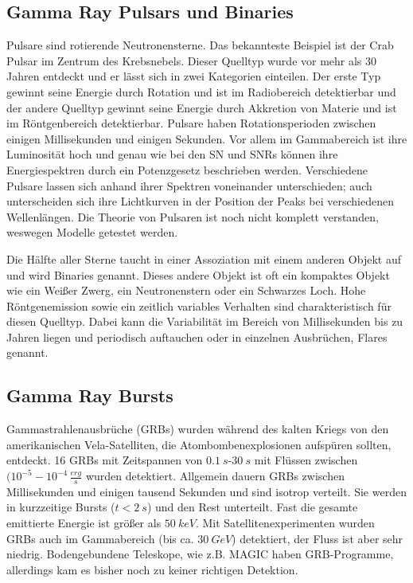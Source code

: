 \subsection{Gamma Ray Pulsars und Binaries}
Pulsare sind rotierende Neutronensterne. 
Das bekannteste Beispiel ist der Crab Pulsar im Zentrum des Krebsnebels.
Dieser Quelltyp wurde vor mehr als 30 Jahren entdeckt und er lässt sich in zwei Kategorien einteilen.
Der erste Typ gewinnt seine Energie durch Rotation und ist im Radiobereich detektierbar und der andere Quelltyp gewinnt seine Energie durch Akkretion von Materie und ist im Röntgenbereich detektierbar.
Pulsare haben Rotationsperioden zwischen einigen Millisekunden und einigen Sekunden.
Vor allem im Gammabereich ist ihre Luminosität hoch und genau wie bei den SN und SNRs können ihre Energiespektren durch ein Potenzgesetz beschrieben werden.
Verschiedene Pulsare lassen sich anhand ihrer Spektren voneinander unterschieden; auch unterscheiden sich ihre Lichtkurven in der Position der Peaks bei verschiedenen Wellenlängen.
Die Theorie von Pulsaren ist noch nicht komplett verstanden, weswegen Modelle getestet werden.\cite{Weekes}

Die Hälfte aller Sterne taucht in einer Assoziation mit einem anderen Objekt auf und wird Binaries genannt.
Dieses andere Objekt ist oft ein kompaktes Objekt wie ein Weißer Zwerg, ein Neutronenstern oder ein Schwarzes Loch.
Hohe Röntgenemission sowie ein zeitlich variables Verhalten sind charakteristisch für diesen Quelltyp.
Dabei kann die Variabilität im Bereich von Millisekunden bis zu Jahren liegen und periodisch auftauchen oder in einzelnen Ausbrüchen, Flares genannt.\cite{Weekes}


\subsection{Gamma Ray Bursts}
Gammastrahlenausbrüche (GRBs) wurden während des kalten Kriegs von den amerikanischen Vela-Satelliten, die Atombombenexplosionen aufspüren sollten, entdeckt.
16 GRBs mit Zeitspannen von $\SI{0,1}{s}$-$\SI{30}{s}$ mit Flüssen zwischen $(10^{-5}-10^{-4}\,\frac{\si{erg}}{\si{s}}$ wurden detektiert.
Allgemein dauern GRBs zwischen Millisekunden und einigen tausend Sekunden und sind isotrop verteilt.
Sie werden in kurzzeitige Bursts ($t<\SI{2}{s}$) und den Rest unterteilt.
Fast die gesamte emittierte Energie ist größer als $\SI{50}{keV}$.
Mit Satellitenexperimenten wurden GRBs auch im Gammabereich (bis ca. $\SI{30}{GeV}$) detektiert, der Fluss ist aber sehr niedrig.
Bodengebundene Teleskope, wie z.B. MAGIC haben GRB-Programme, allerdings kam es bisher noch zu keiner richtigen Detektion.\cite{Weekes}


